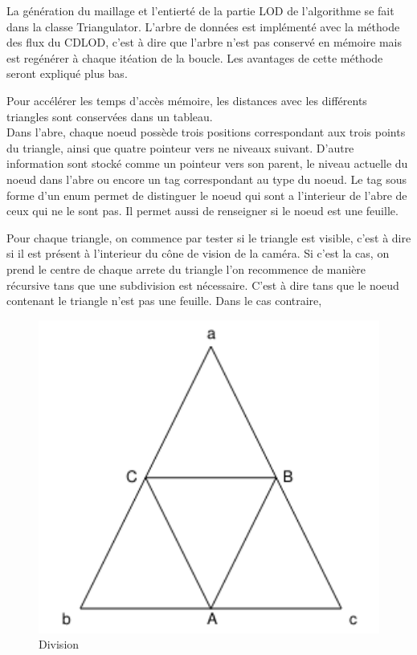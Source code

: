 \documentclass[10pt]{report}
\begin{document}
	
	La génération du maillage et l'entierté de la partie LOD de l'algorithme se fait dans la classe Triangulator.
	L'arbre de données est implémenté avec la méthode des flux du CDLOD, c'est à dire que l'arbre n'est
	pas conservé en mémoire mais est regénérer à chaque itéation de la boucle. Les avantages de cette méthode seront 
	expliqué plus bas.
	
	Pour accélérer les temps d'accès mémoire, les distances avec les différents triangles sont conservées
	dans un tableau. \\

	Dans l'abre, chaque noeud possède trois positions correspondant aux trois points du triangle,
	ainsi que quatre pointeur vers ne niveaux suivant.
	D'autre information sont stocké comme un pointeur vers son parent, le niveau actuelle du
	noeud dans l'abre ou encore un tag correspondant au type du noeud.
	Le tag sous forme d'un enum permet de distinguer le noeud qui sont a l'interieur de l'abre de ceux
	qui ne le sont pas. Il permet aussi de renseigner si le noeud est une feuille.
		
	Pour chaque triangle, on commence par tester si le triangle est visible, c'est à dire si il est
	présent à l'interieur du cône de vision de la caméra. Si c'est la cas, on prend le centre de chaque
	arrete du triangle l'on recommence de manière récursive tans que une subdivision est nécessaire.
	C'est à dire tans que le noeud contenant le triangle n'est pas une feuille. Dans le cas contraire,
	
	\begin{figure}[!h]
    \includegraphics[width=12cm]{img/TriangleSplit.png}
    \caption{Division}
    \label{fig:TriangleSplit}
	\end{figure}
	
\end{document}
